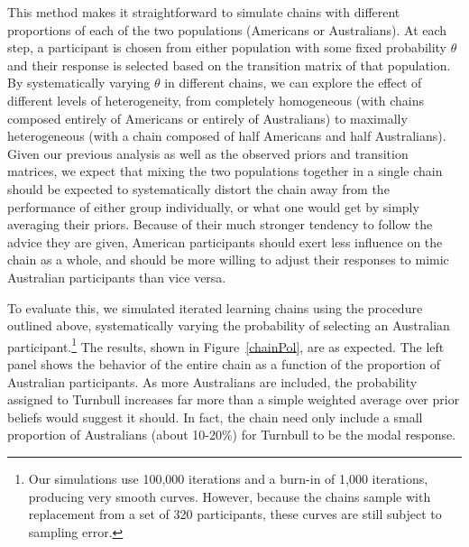 \documentclass[doc]{apa6}
\begin{document}
This method makes it straightforward to simulate chains with different proportions of each of the two populations (Americans or Australians). At each step, a participant is chosen from either population with some fixed probability $\theta$ and their response is selected based on the transition matrix of that population. By systematically varying $\theta$ in different chains, we can explore the effect of different levels of heterogeneity, from completely homogeneous (with chains composed entirely of Americans or entirely of Australians) to maximally heterogeneous (with a chain composed of half Americans and half Australians). Given our previous analysis as well as the observed priors and transition matrices, we expect that mixing the two populations together in a single chain should be expected to systematically distort the chain away from the performance of either group individually, or what one would get by simply averaging their priors. Because of their much stronger tendency to follow the advice they are given, American participants should exert less influence on the chain as a whole, and should be more willing to adjust their responses to mimic Australian participants than vice versa.

To evaluate this, we simulated iterated learning chains using the procedure outlined above, systematically varying the probability of selecting an Australian participant.\footnote{Our simulations use 100,000 iterations and a burn-in of 1,000 iterations, producing very smooth curves. However, because the chains sample with replacement from a set of 320 participants, these curves are still subject to sampling error.} The results, shown in Figure~\ref{chainPol}, are as expected. The left panel shows the behavior of the entire chain as a function of the proportion of Australian participants. As more Australians are included, the probability assigned to Turnbull increases far more than a simple weighted average over prior beliefs would suggest it should. In fact, the chain need only include a small proportion of Australians (about 10-20\%) for Turnbull to be the modal response.
\end{document}
